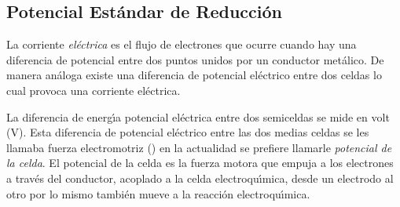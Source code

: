 \subsection{Potencial Est\'andar de Reducci\'on}
La corriente \textit{el\'ectrica} es el flujo de  electrones que ocurre cuando hay una diferencia de potencial entre dos puntos unidos por un conductor met\'alico. De manera an\'aloga existe una diferencia de potencial el\'ectrico entre dos celdas  lo cual provoca una corriente el\'ectrica.

La diferencia de energ\'{\i}a potencial el\'ectrica entre dos semiceldas  se mide en volt (V). Esta diferencia de potencial el\'ectrico entre las dos medias celdas se les llamaba fuerza electromotriz () en la actualidad se prefiere llamarle \textit{potencial de la celda}. El potencial de la celda es la fuerza motora que empuja a los electrones a trav\'es del conductor, acoplado a la celda electroqu\'{\i}mica, desde un electrodo al otro por lo mismo tambi\'en mueve a la reacci\'on electroqu\'{\i}mica.

